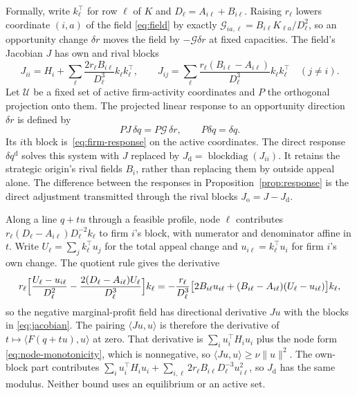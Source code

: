 Formally, write $k_\ell^\top$ for row $\ell$ of $K$ and $D_\ell=A_{i\ell}+B_{i\ell}$.
Raising $r_\ell$ lowers coordinate $(i,a)$ of the field \eqref{eq:field}
by exactly $\mathcal G_{ia,\ell}=B_{i\ell}K_{\ell a}/D_\ell^2$, so an
opportunity change $\delta r$ moves the field by $-\mathcal G\delta r$ at
fixed capacities.
The field's Jacobian $J$ has own and rival blocks
\begin{equation}\label{eq:jacobian}
  J_{ii}=H_i+\sum_\ell\frac{2r_\ell B_{i\ell}}{D_\ell^3}k_\ell k_\ell^\top,
  \qquad
  J_{ij}=\sum_\ell\frac{r_\ell(B_{i\ell}-A_{i\ell})}{D_\ell^3}k_\ell k_\ell^\top
  \quad(j\ne i).
\end{equation}
Let $\mathcal U$ be a fixed set of active firm-activity coordinates and $P$
the orthogonal projection onto them.
The projected linear response to an opportunity direction $\delta r$ is defined by
\begin{equation}\label{eq:linear-response}
  PJ\,\delta q=P\mathcal G\,\delta r,\qquad P\delta q=\delta q.
\end{equation}
Its $i$th block is~\eqref{eq:firm-response} on the active coordinates.
The direct response $\delta q^{\mathrm d}$ solves this system with $J$
replaced by $J_{\mathrm d}=\operatorname{blockdiag}(J_{ii})$.
It retains the strategic origin's rival fields $B_i$, rather than replacing
them by outside appeal alone.
The difference between the responses in Proposition~\ref{prop:response}
is the direct adjustment transmitted through the rival blocks
$J_{\mathrm o}=J-J_{\mathrm d}$.

Along a line $q+tu$ through a feasible profile, node $\ell$ contributes
$r_\ell(D_\ell-A_{i\ell})D_\ell^{-2}k_\ell$ to firm $i$'s block, with
numerator and
denominator affine in $t$.
Write $U_\ell=\sum_{j}k_\ell^\top u_j$ for the total appeal change and
$u_{i\ell}=k_\ell^\top u_i$ for firm $i$'s own change.
The quotient rule gives the derivative
\begin{equation}\label{eq:app-node-quotient}
  r_\ell\Bigl[\frac{U_\ell-u_{i\ell}}{D_\ell^2}
  -\frac{2(D_\ell-A_{i\ell})U_\ell}{D_\ell^3}\Bigr]k_\ell
  =-\frac{r_\ell}{D_\ell^3}\bigl[2B_{i\ell}u_{i\ell}
  +(B_{i\ell}-A_{i\ell})(U_\ell-u_{i\ell})\bigr]k_\ell,
\end{equation}
so the negative marginal-profit field has directional derivative $Ju$ with the
blocks in \eqref{eq:jacobian}.
The pairing $\langle Ju,u\rangle$ is therefore the derivative of
$t\mapsto\langle F(q+tu),u\rangle$ at zero.
That derivative is $\sum_{i}u_i^\top H_i u_i$ plus the node form
\eqref{eq:node-monotonicity}, which is nonnegative, so
$\langle Ju,u\rangle\geq\nu\|u\|^2$.
The own-block part contributes
$\sum_{i}u_i^\top H_i u_i+\sum_{i,\ell}2r_\ell B_{i\ell}D_\ell^{-3}u_{i\ell}^2$,
so $J_{\mathrm d}$ has the same modulus.
Neither bound uses an equilibrium or an active set.

